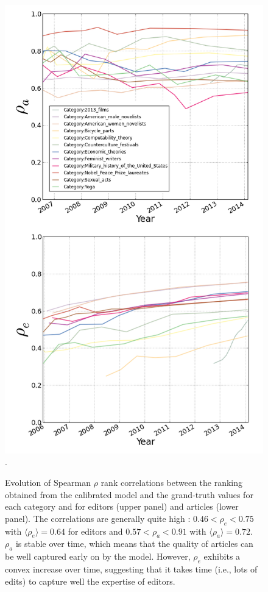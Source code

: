 \begin{figure}[!t]
\centering
\includegraphics[width=0.9\columnwidth]{Figures/rho_combined.png}.
\caption{Evolution of Spearman $\rho$ rank correlations between the ranking obtained from the calibrated model and the grand-truth values for each category and for editors (upper panel)  and articles (lower panel). The correlations are generally quite high : $ 0.46 < \rho_e < 0.75$ with $\langle \rho_e\rangle = 0.64$ for editors and $0.57 < \rho_a < 0.91$ with $\langle \rho_a\rangle = 0.72$. $\rho_{a}$  is stable over time, which means that the quality of articles can be well captured early on by the model. However, $\rho_e$ exhibits a convex increase over time, suggesting that it takes time (i.e., lots of edits) to capture well the expertise of editors.}
\label{fig:rhotime}
\end{figure}




